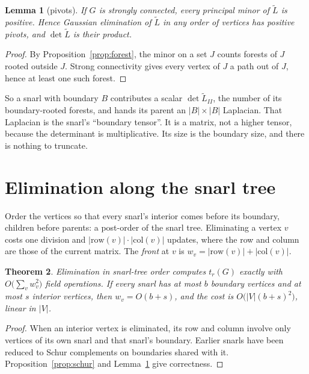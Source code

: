 \documentclass[11pt]{article}
\theoremstyle{plain}
\newtheorem{theorem}{Theorem}
\newtheorem{lemma}[theorem]{Lemma}
\theoremstyle{definition}
\theoremstyle{remark}
\newcommand{\Lt}{\widetilde L}
\begin{document}
\begin{lemma}[pivots]\label{lem:piv}
If $G$ is strongly connected, every principal minor of $\Lt$ is positive. Hence Gaussian elimination of
$\Lt$ in any order of vertices has positive pivots, and $\det\Lt$ is their product.
\end{lemma}

\begin{proof}
By Proposition~\ref{prop:forest}, the minor on a set $J$ counts forests of $J$ rooted outside $J$. Strong
connectivity gives every vertex of $J$ a path out of $J$, hence at least one such forest.
\end{proof}

So a snarl with boundary $B$ contributes a scalar $\det\Lt_{II}$, the number of its boundary-rooted
forests, and hands its parent an $|B|\times|B|$ Laplacian. That Laplacian is the snarl's ``boundary
tensor''. It is a matrix, not a higher tensor, because the determinant is multiplicative. Its size is the
boundary size, and there is nothing to truncate.

\section{Elimination along the snarl tree}\label{sec:tree}

Order the vertices so that every snarl's interior comes before its boundary, children before parents:
a post-order of the snarl tree. Eliminating a vertex $v$ costs one division and $|\mathrm{row}(v)|\cdot
|\mathrm{col}(v)|$ updates, where the row and column are those of the current matrix. The \emph{front} at
$v$ is $w_v=|\mathrm{row}(v)|+|\mathrm{col}(v)|$.

\begin{theorem}\label{thm:linear}
Elimination in snarl-tree order computes $t_r(G)$ exactly with $O\bigl(\sum_vw_v^2\bigr)$ field
operations. If every snarl has at most $b$ boundary vertices and at most $s$ interior vertices, then
$w_v=O(b+s)$, and the cost is $O\bigl(|V|(b+s)^2\bigr)$, linear in $|V|$.
\end{theorem}

\begin{proof}
When an interior vertex is eliminated, its row and column involve only vertices of its own snarl and
that snarl's boundary. Earlier snarls have been reduced to Schur complements on boundaries shared with
it. Proposition~\ref{prop:schur} and Lemma~\ref{lem:piv} give correctness.
\end{proof}
\end{document}
